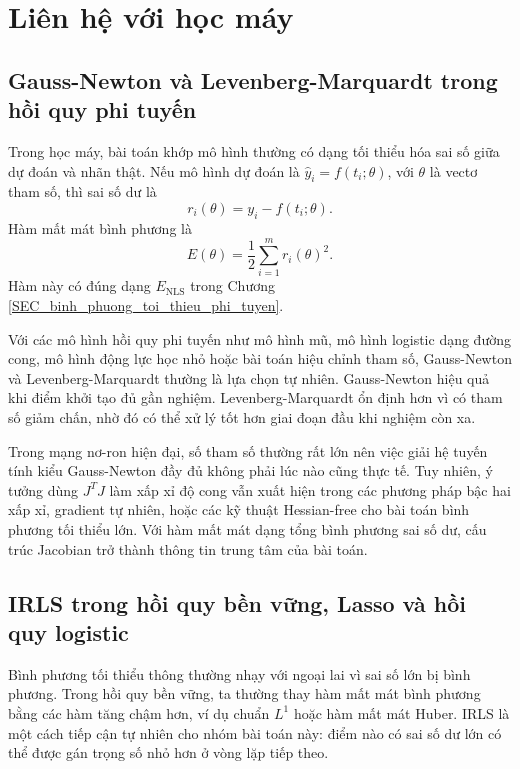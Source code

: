
\section{Liên hệ với học máy}
\label{SEC_lien_he_hoc_may}

\subsection{Gauss-Newton và Levenberg-Marquardt trong hồi quy phi tuyến}
\label{SUB_SEC_ml_gn_lm}
Trong học máy, bài toán khớp mô hình thường có dạng tối thiểu hóa sai số giữa dự đoán và nhãn thật. Nếu mô hình dự đoán là $\hat{y}_i=f(t_i;\theta)$, với $\theta$ là vectơ tham số, thì sai số dư là
\begin{equation}
    r_i(\theta)=y_i-f(t_i;\theta).
    \label{eq_ml_residual}
\end{equation}
Hàm mất mát bình phương là
\begin{equation}
    E(\theta)=\frac{1}{2}\sum_{i=1}^{m}r_i(\theta)^2.
    \label{eq_ml_squared_loss}
\end{equation}
Hàm này có đúng dạng $E_{\mathrm{NLS}}$ trong Chương \ref{SEC_binh_phuong_toi_thieu_phi_tuyen}.
\medskip

Với các mô hình hồi quy phi tuyến như mô hình mũ, mô hình logistic dạng đường cong, mô hình động lực học nhỏ hoặc bài toán hiệu chỉnh tham số, Gauss-Newton và Levenberg-Marquardt thường là lựa chọn tự nhiên. Gauss-Newton hiệu quả khi điểm khởi tạo đủ gần nghiệm. Levenberg-Marquardt ổn định hơn vì có tham số giảm chấn, nhờ đó có thể xử lý tốt hơn giai đoạn đầu khi nghiệm còn xa.
\medskip

Trong mạng nơ-ron hiện đại, số tham số thường rất lớn nên việc giải hệ tuyến tính kiểu Gauss-Newton đầy đủ không phải lúc nào cũng thực tế. Tuy nhiên, ý tưởng dùng $J^{T}J$ làm xấp xỉ độ cong vẫn xuất hiện trong các phương pháp bậc hai xấp xỉ, gradient tự nhiên, hoặc các kỹ thuật Hessian-free cho bài toán bình phương tối thiểu lớn. Với hàm mất mát dạng tổng bình phương sai số dư, cấu trúc Jacobian trở thành thông tin trung tâm của bài toán.

\subsection{IRLS trong hồi quy bền vững, Lasso và hồi quy logistic}
\label{SUB_SEC_ml_irls}
Bình phương tối thiểu thông thường nhạy với ngoại lai vì sai số lớn bị bình phương. Trong hồi quy bền vững, ta thường thay hàm mất mát bình phương bằng các hàm tăng chậm hơn, ví dụ chuẩn $L^1$ hoặc hàm mất mát Huber. IRLS là một cách tiếp cận tự nhiên cho nhóm bài toán này: điểm nào có sai số dư lớn có thể được gán trọng số nhỏ hơn ở vòng lặp tiếp theo.
\medskip

